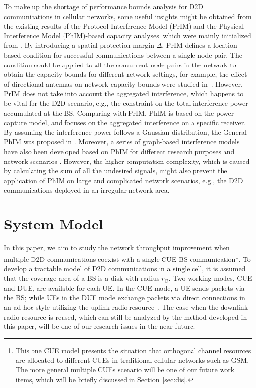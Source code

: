 \documentclass[journal, 10pt]{IEEEtran}
\begin{document}
To make up the shortage of performance bounds analysis for D2D
communications in cellular networks, some useful insights might be
obtained from the existing results of the Protocol Interference Model
(PrIM) and the Physical Interference Model (PhIM)-based capacity
analyses, which were mainly initialized from \cite{Gupta:2000ht}. By
introducing a spatial protection margin $\Delta$, PrIM defines a
location-based condition for successful communications between a
single node pair. The condition could be applied to all the concurrent
node pairs in the network to obtain the capacity bounds for different
network settings, for example, the effect of directional antennas on
network capacity bounds were studied in~\cite{Yi:2003wh}. However,
PrIM does not take into account the aggregated interference, which
happens to be vital for the D2D scenario, e.g., the constraint on the
total interference power accumulated at the BS. Comparing with PrIM,
PhIM is based on the power capture model, and focuses on the
aggregated interference on a specific receiver. By assuming the
interference power follows a Gaussian distribution, the General PhIM
was proposed in \cite{Agarwal:2004vz}. Moreover, a series of
graph-based interference models have also been developed based on PhIM
for different research purposes and network scenarios
\cite{Brar:2006uu,Kim:2007fv}. However, the higher computation
complexity, which is caused by calculating the sum of all the
undesired signals, might also prevent the application of PhIM on large
and complicated network scenarios, e.g., the D2D communications
deployed in an irregular network area.


\section{System Model}\label{sec:sysMod}

In this paper, we aim to study the network throughput improvement when
multiple D2D communications coexist with a single CUE-BS
communication\footnote{This one CUE model presents the situation that
orthogonal channel resources are allocated to different CUEs in
traditional cellular networks such as GSM. The more general multiple
CUEs scenario will be one of our future work items, which will be
briefly discussed in Section~\ref{sec:dis}.}. To develop a tractable
model of D2D communications in a single cell, it is assumed that the
coverage area of a BS is a disk with radius $r_\mathrm{C}$. Two
working modes, CUE and DUE, are available for each UE. In the CUE
mode, a UE sends packets via the BS; while UEs in the DUE mode
exchange packets via direct connections in an ad hoc style utilizing
the uplink radio resource~\cite{Doppler:09MCom}. The case when the
downlink radio resource is reused, which can still be analyzed by the
method developed in this paper, will be one of our research issues in
the near future.
\end{document}
